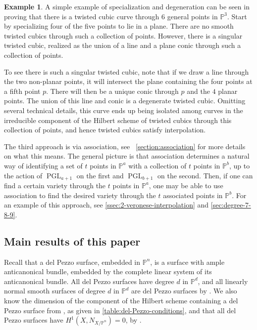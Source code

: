 \documentclass[reqno, 11pt]{amsart}
\theoremstyle{definition}
\theoremstyle{remark}
\numberwithin{equation}{section}
\numberwithin{thm}{section}
\numberwithin{prop}{section}
\numberwithin{lem}{section}
\numberwithin{cor}{section}
\numberwithin{conj}{section}
\numberwithin{defn}{section}
\DeclareMathOperator\PGL{PGL}
\theoremstyle{plain}
\theoremstyle{definition}
\newtheorem{example}[theorem]{Example}
\newcommand\bp{{\mathbb P}}
\begin{document}
\begin{example}\label{example:degeneration-rnc}
	\label{example:}
	A simple example of specialization
and degeneration can be seen in proving
that there is a twisted cubic curve
through $6$ general
points in $\bp^3$. Start by specializing four of the five
points to lie in a plane. There are no smooth twisted
cubics through such a collection of points. However,
there is a singular twisted cubic, realized
as the union of a line and a plane conic through such a collection of points.

To see there is such a singular twisted cubic, note
that if we draw a line through the two non-planar points,
it will intersect the plane containing the four points
at a fifth point $p$. There will then be a unique conic
through $p$ and the $4$ planar points. The union of this
line and conic is a degenerate twisted cubic.
Omitting several technical details, this
curve ends up being isolated among curves in the irreducible component
of the Hilbert scheme of twisted cubics through this
collection of points, and hence twisted cubics
satisfy interpolation.
\end{example}

The third approach is via association, see
~\autoref{section:association} for more details on
what this means. The general picture
is that association determines a natural way of
identifying a set of $t$ points in $\bp^a$ with a collection of $t$ points
in $\bp^b$, up to the action of $\PGL_{a+1}$ on the first
and $\PGL_{b+1}$ on the second. 
Then, if one can find a certain variety through the $t$ points
in $\bp^a$, one may be able to use association to find
the desired variety through the $t$ associated points in
$\bp^b$. For an example of this approach, see
\autoref{ssec:2-veronese-interpolation} and \autoref{sec:degree-7-8-9}.


\subsection{Main results of this paper} 

Recall that a del Pezzo surface, embedded in $\bp^n$,
is a surface with ample anticanonical bundle, embedded
by the complete linear system of its
anticanonical bundle. All del Pezzo surfaces have
degree $d$ in $\bp^d$, and
all linearly normal smooth surfaces of degree $d$ in $\bp^d$ are del Pezzo
surfaces by
\cite[Theorem 2.5]{coskun:the-enumerative-geometry-of-del-Pezzo-surfaces-via-degenerations}.
We also know the dimension of the component of the Hilbert
scheme containing a del Pezzo surface from \cite[Lemma 2.3]{coskun:the-enumerative-geometry-of-del-Pezzo-surfaces-via-degenerations}, as given
in \autoref{table:del-Pezzo-conditions}, and that all del Pezzo
surfaces have $H^1(X, N_{X/\bp^n}) = 0$, by \cite[Lemma 5.7]{coskun:the-enumerative-geometry-of-del-Pezzo-surfaces-via-degenerations}.
\end{document}

